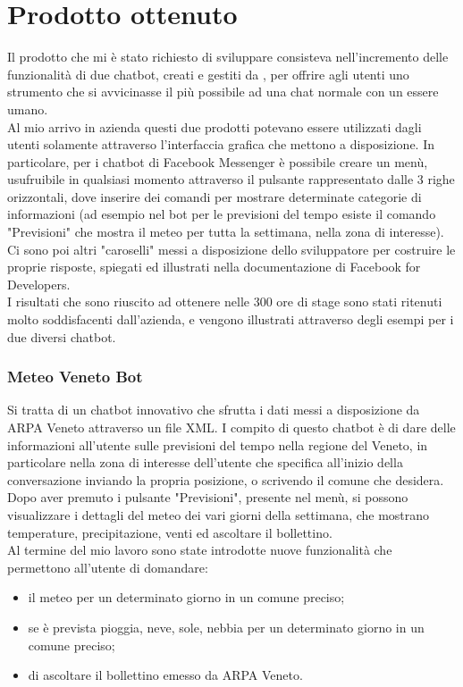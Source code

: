 \section{Prodotto ottenuto}
Il prodotto che mi è stato richiesto di sviluppare consisteva nell'incremento delle funzionalità di due \gls{chatbot}, creati e gestiti da \azienda{}, per offrire agli utenti uno strumento che si avvicinasse il più possibile ad una chat normale con un essere umano.\\
Al mio arrivo in azienda questi due prodotti potevano essere utilizzati dagli utenti solamente attraverso l'interfaccia grafica che mettono a disposizione. In particolare, per i \gls{chatbot} di Facebook Messenger è possibile creare un menù, usufruibile in qualsiasi momento attraverso il pulsante rappresentato dalle 3 righe orizzontali, dove inserire dei comandi per mostrare determinate categorie di informazioni (ad esempio nel bot per le previsioni del tempo esiste il comando "Previsioni" che mostra il meteo per tutta la settimana, nella zona di interesse). Ci sono poi altri "caroselli" messi a disposizione dello sviluppatore per costruire le proprie risposte, spiegati ed illustrati nella documentazione di Facebook for Developers.\\

I risultati che sono riuscito ad ottenere nelle 300 ore di stage sono stati ritenuti molto soddisfacenti dall'azienda, e vengono illustrati attraverso degli esempi per i due diversi \gls{chatbot}.

\subsubsection{Meteo Veneto Bot}
Si tratta di un \gls{chatbot} innovativo che sfrutta i dati messi a disposizione da ARPA Veneto attraverso un file \gls{XML}. I compito di questo  \gls{chatbot} è di dare delle informazioni all'utente sulle previsioni del tempo nella regione del Veneto, in particolare nella zona di interesse dell'utente che specifica all'inizio della conversazione inviando la propria posizione, o scrivendo il comune che desidera. Dopo aver premuto i pulsante "Previsioni", presente nel menù, si possono visualizzare i dettagli del meteo dei vari giorni della settimana, che mostrano temperature, precipitazione, venti ed ascoltare il bollettino.\\
Al termine del mio lavoro sono state introdotte nuove funzionalità che permettono all'utente di domandare:
\begin{itemize}
	\item il meteo per un determinato giorno in un comune preciso;
	\item se è prevista pioggia, neve, sole, nebbia per un determinato giorno in un comune preciso;
	\item di ascoltare il bollettino emesso da ARPA Veneto.
\end{itemize}

